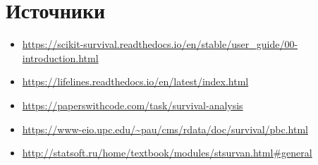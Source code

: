 \documentclass[
  11pt,
]{article}
\begin{document}
\hypertarget{ux438ux441ux442ux43eux447ux43dux438ux43aux438}{%
\section{Источники}\label{ux438ux441ux442ux43eux447ux43dux438ux43aux438}}

\begin{itemize}
\item
  \url{https://scikit-survival.readthedocs.io/en/stable/user_guide/00-introduction.html}
\item
  \url{https://lifelines.readthedocs.io/en/latest/index.html}
\item
  \url{https://paperswithcode.com/task/survival-analysis}
\item
  \url{https://www-eio.upc.edu/~pau/cms/rdata/doc/survival/pbc.html}
\item
  \url{http://statsoft.ru/home/textbook/modules/stsurvan.html\#general}
\end{itemize}
\end{document}
